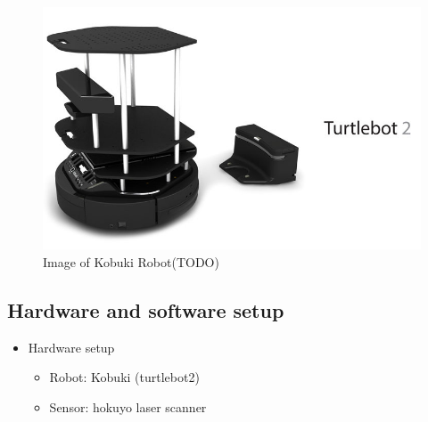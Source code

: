 \documentclass[letterpaper, 10 pt, conference]{ieeeconf}  %
\begin{document}
\begin{figure}[ht]
  \includegraphics[width=\linewidth]{kobuki_image.jpg}
  \caption{Image of Kobuki Robot(TODO)} 
  \label{fig:Kobuki_image}
\end{figure}
\subsection{Hardware and software setup}
\begin{itemize}
\item  Hardware setup 
    \begin{itemize}
        \item Robot: Kobuki (turtlebot2)
        \item Sensor: hokuyo laser scanner
    \end{itemize}{}
\end{itemize}
\end{document}
